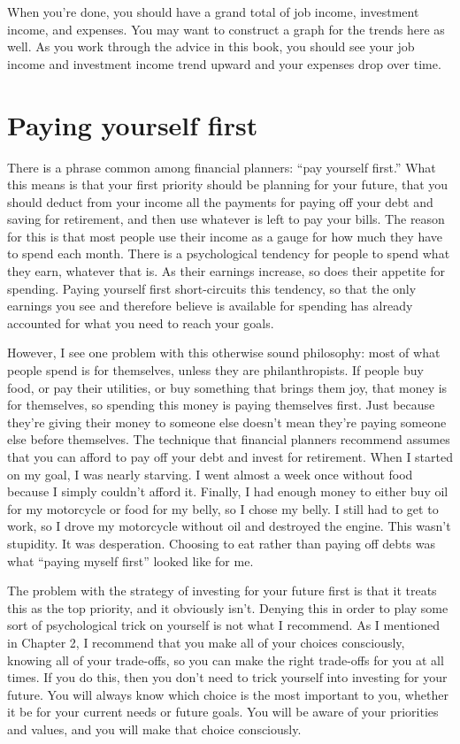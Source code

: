 When you're done, you should have a grand total of job income, investment income, and expenses. You may want to construct a graph for the trends here as well. As you work through the advice in this book, you should see your job income and investment income trend upward and your expenses drop over time.

\section{Paying yourself first}
There is a phrase common among financial planners: ``pay yourself first.'' What this means is that your first priority should be planning for your future, that you should deduct from your income all the payments for paying off your debt and saving for retirement, and then use whatever is left to pay your bills. The reason for this is that most people use their income as a gauge for how much they have to spend each month. There is a psychological tendency for people to spend what they earn, whatever that is. As their earnings increase, so does their appetite for spending. Paying yourself first short-circuits this tendency, so that the only earnings you see and therefore believe is available for spending has already accounted for what you need to reach your goals.

However, I see one problem with this otherwise sound philosophy: most of what people spend is for themselves, unless they are philanthropists. If people buy food, or pay their utilities, or buy something that brings them joy, that money is for themselves, so spending this money is paying themselves first. Just because they're giving their money to someone else doesn't mean they're paying someone else before themselves. The technique that financial planners recommend assumes that you can afford to pay off your debt and invest for retirement. When I started on my goal, I was nearly starving. I went almost a week once without food because I simply couldn't afford it. Finally, I had enough money to either buy oil for my motorcycle or food for my belly, so I chose my belly. I still had to get to work, so I drove my motorcycle without oil and destroyed the engine. This wasn't stupidity. It was desperation. Choosing to eat rather than paying off debts was what ``paying myself first'' looked like for me.

The problem with the strategy of investing for your future first is that it treats this as the top priority, and it obviously isn't. Denying this in order to play some sort of psychological trick on yourself is not what I recommend. As I mentioned in Chapter 2, I recommend that you make all of your choices consciously, knowing all of your trade-offs, so you can make the right trade-offs for you at all times. If you do this, then you don't need to trick yourself into investing for your future. You will always know which choice is the most important to you, whether it be for your current needs or future goals. You will be aware of your priorities and values, and you will make that choice consciously.

